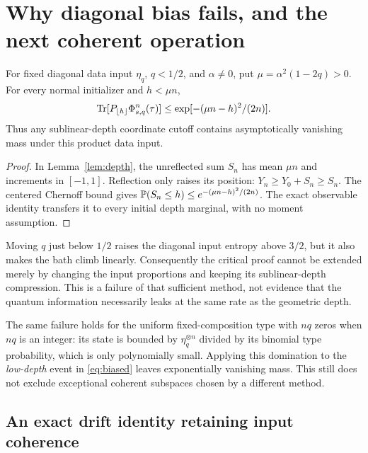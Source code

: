 \section{Why diagonal bias fails, and the next coherent operation}\label{sec:continuation}

\begin{proposition}\label{prop:biased}
For fixed diagonal data input $\eta_q$, $q<1/2$, and $\alpha\ne0$, put $\mu=\alpha^2(1-2q)>0$. For every normal initializer and $h<\mu n$,
\begin{equation}
 \operatorname{Tr}[P_{\lfloor h\rfloor}\Phi_{s,q}^n(\tau)]
 \le\exp[-(\mu n-h)^2/(2n)].\label{eq:biased}
\end{equation}
Thus any sublinear-depth coordinate cutoff contains asymptotically vanishing mass under this product data input.
\end{proposition}
\begin{proof}
In Lemma~\ref{lem:depth}, the unreflected sum $S_n$ has mean $\mu n$ and increments in $[-1,1]$. Reflection only raises its position: $Y_n\ge Y_0+S_n\ge S_n$. The centered Chernoff bound gives $\mathbb P(S_n\le h)\le e^{-(\mu n-h)^2/(2n)}$. The exact observable identity transfers it to every initial depth marginal, with no moment assumption.
\end{proof}

Moving $q$ just below $1/2$ raises the diagonal input entropy above $3/2$, but it also makes the bath climb linearly. Consequently the critical proof cannot be extended merely by changing the input proportions and keeping its sublinear-depth compression. This is a failure of that sufficient method, not evidence that the quantum information necessarily leaks at the same rate as the geometric depth.

The same failure holds for the uniform fixed-composition type with $nq$ zeros when $nq$ is an integer: its state is bounded by $\eta_q^{\otimes n}$ divided by its binomial type probability, which is only polynomially small. Applying this domination to the \emph{low-depth} event in \eqref{eq:biased} leaves exponentially vanishing mass. This still does not exclude exceptional coherent subspaces chosen by a different method.

\subsection{An exact drift identity retaining input coherence}


